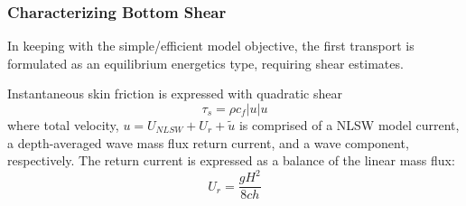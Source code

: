 \documentclass[aspectratio=169]{beamer}
\begin{document}
\begin{frame}
  \frametitle{Characterizing Bottom Shear }

In keeping with the simple/efficient model objective, the first
transport is formulated as an equilibrium energetics type, requiring
shear estimates.

Instantaneous skin friction is expressed with quadratic shear
\begin{equation*}
\tau_s = \rho c_f |u|u 
\end{equation*}
where total velocity, $u = U_{NLSW} + U_r + \tilde{u} $ is comprised
of a NLSW model current, a depth-averaged wave mass flux return current,
and a wave component, respectively.  The return current is expressed as a balance of the linear mass flux:
\begin{equation*}
U_r =   \frac{g H^2}{8 c h}
\end{equation*}
\end{frame}
\end{document}
